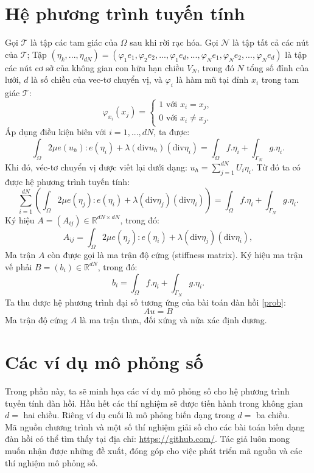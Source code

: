 \documentclass[
12pt, %
oneside, %
english, %
onehalfspacing, %
nolistspacing, %
headsepline, %
addchap,
]{MastersDoctoralThesis} %
\begin{document}
\section{Hệ phương trình tuyến tính}\label{sec:chap1_linearSystem}
Gọi $\mathcal{T}$ là tập các tam giác của $\Omega$ sau khi rời rạc hóa. Gọi $\mathcal{N}$ là tập tất cả các nút của $\mathcal{T}$; Tập $(\eta_k,...,\eta_{dN})=(\varphi_1e_1, \varphi_2e_2,...,\varphi_1e_d,...,\varphi_Ne_1,\varphi_Ne_2,...,\varphi_Ne_d)$ là tập các nút cơ sở của không gian con hữu hạn chiều $V_N$, trong đó $N$ tổng số đỉnh của lưới, $d$ là số chiều của vec-tơ chuyển vị, và $\varphi_i$ là hàm mũ tại đỉnh $x_i$ trong tam giác $\mathcal{T}$:
$$\varphi_{x_i}(x_j) = \begin{cases}
1 \text{ với } x_i = x_j, \\
0 \text{ với } x_i \neq x_j.
\end{cases}$$
Áp dụng điều kiện biên với $i = 1,...,dN$, ta được:
$$\int_\Omega 2\mu e(u_h) : e(\eta_i) + \lambda(\text{div}u_h)(\text{div}\eta_i) = \int_\Omega f.\eta_i + \int_{\Gamma_N}g.\eta_i.$$
Khi đó, véc-tơ chuyển vị được viết lại dưới dạng: $u_h = \sum_{j=1}^{dN}U_i\eta_i$. Từ đó ta có được hệ phương trình tuyến tính:
$$\displaystyle\sum^{dN}_{i=1}(\displaystyle\int_\Omega 2\mu e(\eta_j) : e(\eta_i) + \lambda(\text{div}\eta_j)(\text{div}\eta_i)) = \int_\Omega f.\eta_i + \int_{\Gamma_N}g.\eta_i.$$
Ký hiệu $A=(A_{ij})\in\mathbb{R}^{dN \times dN}$, trong đó:
$$A_{ij}=\displaystyle\int_\Omega 2\mu e(\eta_j) : e(\eta_i) + \lambda(\text{div}\eta_j)(\text{div}\eta_i),$$
Ma trận $A$ còn được gọi là ma trận độ cứng (stiffness matrix). Ký hiệu ma trận vế phải $B=(b_i)\in\mathbb{R}^{dN}$, trong đó:
$$b_i=\int_\Omega f.\eta_i + \int_{\Gamma_N}g.\eta_i.$$
Ta thu được hệ phương trình đại số tương ứng của bài toán đàn hồi \eqref{prob}:
\begin{equation}\label{pron}
Au=B
\end{equation}
Ma trận độ cứng $A$ là ma trận thưa, đối xứng và nửa xác định dương.
\section{Các ví dụ mô phỏng số}
Trong phần này, ta sẽ minh họa các ví dụ mô phỏng số cho hệ phương trình tuyến tính đàn hồi. Hầu hết các thí nghiệm sẽ được tiến hành trong không gian $d=$ hai chiều. Riêng ví dụ cuối là mô phỏng biến dạng trong $d=$ ba chiều.\\
Mã nguồn chương trình và một số thí nghiệm giải số cho các bài toán biến dạng đàn hồi có thể tìm thấy tại địa chỉ: \url{https://github.com/}. Tác giả luôn mong muốn nhận được những đề xuất, đóng góp cho việc phát triển mã nguồn và các thí nghiệm mô phỏng số.
\end{document}
